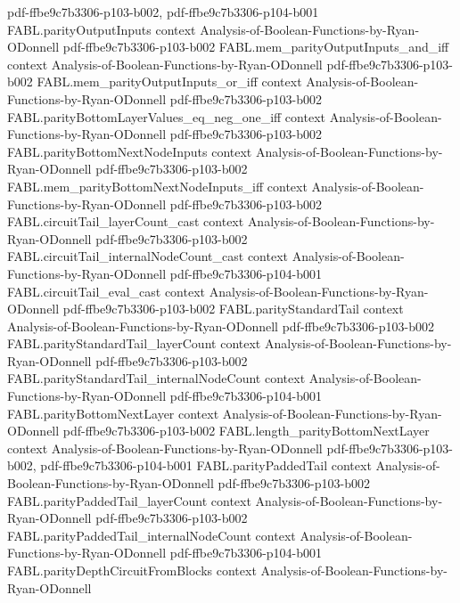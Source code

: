\begin{theorem}
  {pdf-ffbe9c7b3306-p103-b002,
    pdf-ffbe9c7b3306-p104-b001}
\proofstep
  {FABL.parityOutputInputs}
  {context}
  {Analysis-of-Boolean-Functions-by-Ryan-ODonnell}
  {pdf-ffbe9c7b3306-p103-b002}
\proofstep
  {FABL.mem_parityOutputInputs_and_iff}
  {context}
  {Analysis-of-Boolean-Functions-by-Ryan-ODonnell}
  {pdf-ffbe9c7b3306-p103-b002}
\proofstep
  {FABL.mem_parityOutputInputs_or_iff}
  {context}
  {Analysis-of-Boolean-Functions-by-Ryan-ODonnell}
  {pdf-ffbe9c7b3306-p103-b002}
\proofstep
  {FABL.parityBottomLayerValues_eq_neg_one_iff}
  {context}
  {Analysis-of-Boolean-Functions-by-Ryan-ODonnell}
  {pdf-ffbe9c7b3306-p103-b002}
\proofstep
  {FABL.parityBottomNextNodeInputs}
  {context}
  {Analysis-of-Boolean-Functions-by-Ryan-ODonnell}
  {pdf-ffbe9c7b3306-p103-b002}
\proofstep
  {FABL.mem_parityBottomNextNodeInputs_iff}
  {context}
  {Analysis-of-Boolean-Functions-by-Ryan-ODonnell}
  {pdf-ffbe9c7b3306-p103-b002}
\proofstep
  {FABL.circuitTail_layerCount_cast}
  {context}
  {Analysis-of-Boolean-Functions-by-Ryan-ODonnell}
  {pdf-ffbe9c7b3306-p103-b002}
\proofstep
  {FABL.circuitTail_internalNodeCount_cast}
  {context}
  {Analysis-of-Boolean-Functions-by-Ryan-ODonnell}
  {pdf-ffbe9c7b3306-p104-b001}
\proofstep
  {FABL.circuitTail_eval_cast}
  {context}
  {Analysis-of-Boolean-Functions-by-Ryan-ODonnell}
  {pdf-ffbe9c7b3306-p103-b002}
\proofstep
  {FABL.parityStandardTail}
  {context}
  {Analysis-of-Boolean-Functions-by-Ryan-ODonnell}
  {pdf-ffbe9c7b3306-p103-b002}
\proofstep
  {FABL.parityStandardTail_layerCount}
  {context}
  {Analysis-of-Boolean-Functions-by-Ryan-ODonnell}
  {pdf-ffbe9c7b3306-p103-b002}
\proofstep
  {FABL.parityStandardTail_internalNodeCount}
  {context}
  {Analysis-of-Boolean-Functions-by-Ryan-ODonnell}
  {pdf-ffbe9c7b3306-p104-b001}
\proofstep
  {FABL.parityBottomNextLayer}
  {context}
  {Analysis-of-Boolean-Functions-by-Ryan-ODonnell}
  {pdf-ffbe9c7b3306-p103-b002}
\proofstep
  {FABL.length_parityBottomNextLayer}
  {context}
  {Analysis-of-Boolean-Functions-by-Ryan-ODonnell}
  {pdf-ffbe9c7b3306-p103-b002,
    pdf-ffbe9c7b3306-p104-b001}
\proofstep
  {FABL.parityPaddedTail}
  {context}
  {Analysis-of-Boolean-Functions-by-Ryan-ODonnell}
  {pdf-ffbe9c7b3306-p103-b002}
\proofstep
  {FABL.parityPaddedTail_layerCount}
  {context}
  {Analysis-of-Boolean-Functions-by-Ryan-ODonnell}
  {pdf-ffbe9c7b3306-p103-b002}
\proofstep
  {FABL.parityPaddedTail_internalNodeCount}
  {context}
  {Analysis-of-Boolean-Functions-by-Ryan-ODonnell}
  {pdf-ffbe9c7b3306-p104-b001}
\proofstep
  {FABL.parityDepthCircuitFromBlocks}
  {context}
  {Analysis-of-Boolean-Functions-by-Ryan-ODonnell}

\end{theorem}
